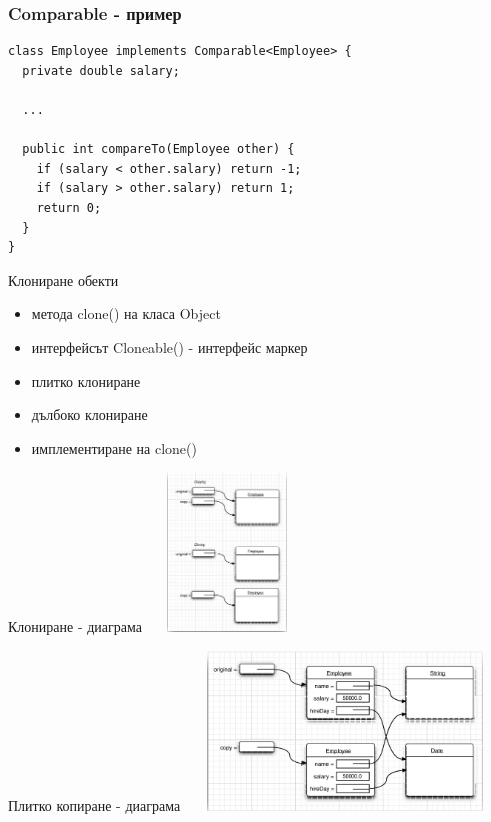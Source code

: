 \documentclass{beamer}
\begin{document}
\begin{frame}[fragile]
  \frametitle{Comparable - пример}
  \transdissolve
\begin{lstlisting}
class Employee implements Comparable<Employee> {
  private double salary;

  ...  

  public int compareTo(Employee other) {
    if (salary < other.salary) return -1;
    if (salary > other.salary) return 1;
    return 0;
  }
}  
\end{lstlisting}
\end{frame}

\begin{frame}{Клониране обекти}
  \transdissolve
  \begin{itemize}
  \item метода clone() на класа Object \pause
  \item интерфейсът Cloneable() - интерфейс маркер \pause
  \item плитко клониране \pause
  \item дълбоко клониране \pause
  \item имплементиране на clone()
  \end{itemize}
\end{frame}

\begin{frame}{Клониране - диаграма}
  \transdissolve
  \includegraphics[width=160px,height=160px]{images/cloning.png}
\end{frame}

\begin{frame}{Плитко копиране - диаграма}
  \transdissolve
  \includegraphics[width=320px,height=160px]{images/shallow-copy.png}
\end{frame}
\end{document}
